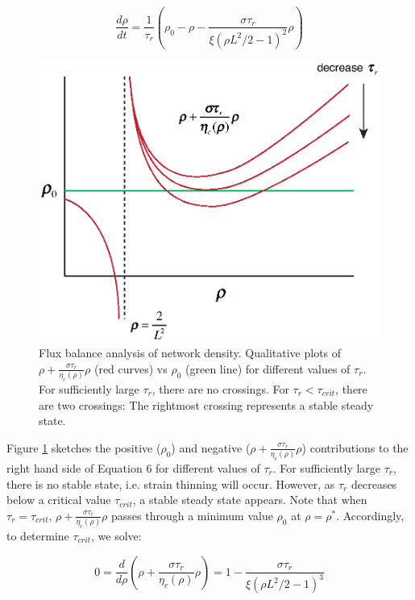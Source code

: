 \documentclass[10pt,letterpaper]{article}
\begin{document}
\begin{equation}
\label{drho_2}
\frac{d\rho}{dt}=\frac{1}{\tau_r}\left ( \rho_0 - \rho - \frac{\sigma \tau_r}{\xi(\rho L^2/2 -1)^2}\rho\right )
\end{equation}

\begin{figure}[h!]
	\centering
	\includegraphics[width=\hsize]{figures/figureS1}
	\caption{\label{fig:flux_balance}  Flux balance analysis of network density. Qualitative plots of $\rho+\frac{\sigma \tau_r}{\eta_c(\rho)}\rho$ (red curves) vs $\rho_0$ (green line) for different values of $\tau_r$.  For sufficiently large $\tau_r$, there are no crossings.  For $\tau_r < \tau_{crit}$, there are two crossings:  The rightmost crossing represents a stable steady state.  }
\end{figure}


Figure \ref{fig:flux_balance} sketches the positive ($\rho_0$) and negative ($\rho+\frac{\sigma \tau_r}{\eta_c(\rho)}\rho$) contributions to the right hand side of Equation 6 for different values of $\tau_r$. For sufficiently large $\tau_r$, there is no stable state, i.e. strain thinning will occur.  However, as $\tau_r$ decreases below a critical value $\tau_{crit}$, a stable steady state appears.  Note that when $\tau_r = \tau_{crit}$, $\rho+\frac{\sigma\tau_r}{\eta_c(\rho)}\rho$ passes through a minimum value $\rho_0$ at $\rho=\rho^*$.  Accordingly, to determine $\tau_{crit}$, we solve:

\begin{equation}
\label{drho_3}
0 = \frac{d}{d\rho}\left( \rho + \frac{\sigma\tau_r}{\eta_c(\rho)} \rho\right ) = 1 - \frac{\sigma\tau_r}{\xi (\rho L^2/2-1)^3}
\end{equation}
\end{document}
